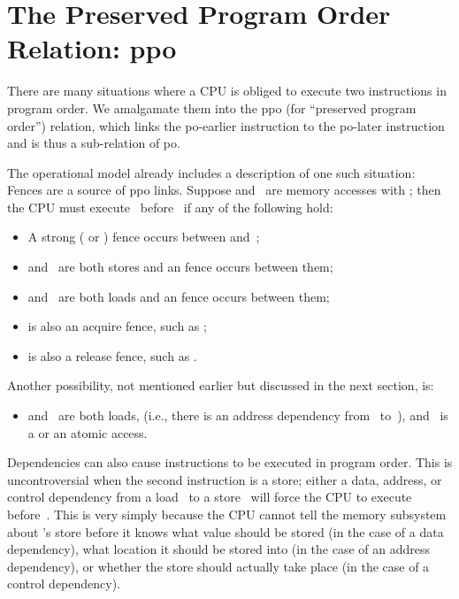 \section{The Preserved Program Order Relation: ppo}
\label{sec:docs:explanation:The Preserved Program Order Relation: ppo}

There are many situations where a CPU is obliged to execute two
instructions in program order.
We amalgamate them into the ppo (for ``preserved program order'')
relation, which links the po-earlier instruction to the po-later
instruction and is thus a sub-relation of po.

The operational model already includes a description of one such
situation:
Fences are a source of ppo links.
Suppose  and~ are memory accesses with ;
then the CPU must execute~ before~ if any of the following hold:

\begin{itemize}
\item	A strong ( or ) fence occurs between
	 and~;

\item	{} and~ are both stores and an  fence occurs between
	them;

\item	{} and~ are both loads and an  fence occurs between
	them;

\item	{} is also an acquire fence, such as ;

\item	{} is also a release fence, such as .
\end{itemize}

Another possibility, not mentioned earlier but discussed in the next
section, is:

\begin{itemize}
\item	{} and~ are both loads,  (i.e., there is an address
	dependency from~ to~), and ~is a  or an atomic
	access.
\end{itemize}

Dependencies can also cause instructions to be executed in program
order.
This is uncontroversial when the second instruction is a
store; either a data, address, or control dependency from a load~ to
a store~ will force the CPU to execute  before~.
This is very
simply because the CPU cannot tell the memory subsystem about 's
store before it knows what value should be stored (in the case of a
data dependency), what location it should be stored into (in the case
of an address dependency), or whether the store should actually take
place (in the case of a control dependency).

